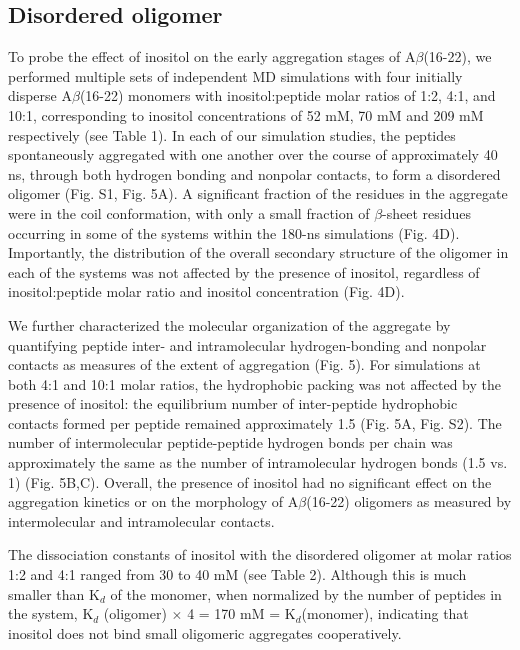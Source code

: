 \subsection{Disordered oligomer}

To probe the effect of inositol on the early aggregation stages of A$\beta$(16-22), we performed multiple sets of independent MD simulations with four initially disperse A$\beta$(16-22) monomers with inositol:peptide molar ratios of 1:2, 4:1, and 10:1, corresponding to inositol concentrations of 52 mM, 70 mM and 209 mM respectively (see Table 1). In each of our simulation studies, the peptides spontaneously aggregated with one another over the course of approximately 40 ns, through both hydrogen bonding and nonpolar contacts, to form a disordered oligomer (Fig. S1, Fig. 5A). A significant fraction of the residues in the aggregate were in the coil conformation, with only a small fraction of $\beta$-sheet residues occurring in some of the systems within the 180-ns simulations (Fig. 4D). Importantly, the distribution of the overall secondary structure of the oligomer in each of the systems was not affected by the presence of inositol, regardless of inositol:peptide molar ratio and inositol concentration (Fig. 4D).

We further characterized the molecular organization of the aggregate by quantifying peptide inter- and intramolecular hydrogen-bonding and nonpolar contacts as measures of the extent of aggregation (Fig. 5). For simulations at both 4:1 and 10:1 molar ratios, the hydrophobic packing was not affected by the presence of inositol: the equilibrium number of inter-peptide hydrophobic contacts formed per peptide remained approximately 1.5 (Fig. 5A, Fig. S2). The number of intermolecular peptide-peptide hydrogen bonds per chain was approximately the same as the number of intramolecular hydrogen bonds (1.5 vs. 1) (Fig. 5B,C). Overall, the presence of inositol had no significant effect on the aggregation kinetics or on the morphology of A$\beta$(16-22) oligomers as measured by intermolecular and intramolecular contacts.

The dissociation constants of inositol with the disordered oligomer at molar ratios 1:2 and 4:1 ranged from 30 to 40 mM (see Table 2). Although this is much smaller than K$_d$ of the monomer, when normalized by the number of peptides in the system, K$_d$ (oligomer) $\times$ 4 = 170 mM = K$_d$(monomer), indicating that inositol does not bind small oligomeric aggregates cooperatively.

